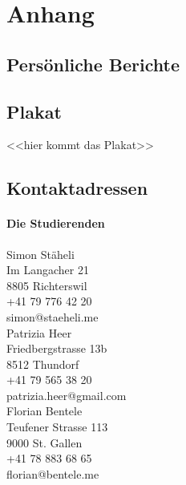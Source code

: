 \chapter{Anhang}






\section{Persönliche Berichte}
















\section{Plakat}
<<hier kommt das Plakat>>

\section{Kontaktadressen}
\subsubsection{Die Studierenden}

Simon Stäheli\\
Im Langacher 21\\
8805 Richterswil\\
+41 79 776 42 20\\
simon@staeheli.me\\

Patrizia Heer\\
Friedbergstrasse 13b\\
8512 Thundorf\\
+41 79 565 38 20\\
patrizia.heer@gmail.com\\

Florian Bentele\\
Teufener Strasse 113\\
9000 St. Gallen\\
+41 78 883 68 65\\
florian@bentele.me

